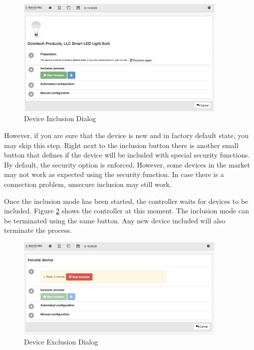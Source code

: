\begin{figure}
\begin{center}
\includegraphics[width=0.9\textwidth]{pngs/cap4/device3.png}
\caption{\zwave Device Inclusion Dialog}
\label{device3}
\end{center}
\end{figure}

\vspace{5mm}
\noindent{}
\vspace{5mm}

However, 
if you are sure that the device is new and in factory default state, you may skip this 
step. Right next to the inclusion button there is another small button that defines if the 
device will be included with special security functions. By default, the security option 
is enforced. However, some devices in the market may not work as expected using the 
security function. In case there is a connection problem, unsecure inclusion may still work.

Once the inclusion mode has been started, the controller waits for devices to be 
included. Figure \ref{incl1} shows the controller at this moment. The inclusion mode can 
be terminated using the same button. Any new device included will also terminate the process.

\begin{figure}
\begin{center}
\includegraphics[width=0.9\textwidth]{pngs/cap4/incl1.png}
\caption{\zwave Device Exclusion Dialog}
\label{incl1}
\end{center}
\end{figure}

